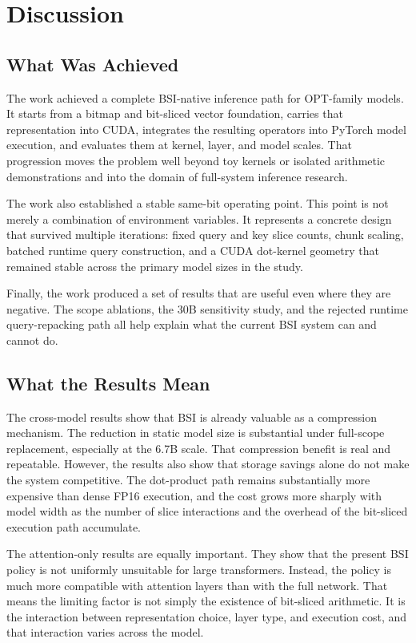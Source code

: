 \chapter{Discussion}

\section{What Was Achieved}
The work achieved a complete BSI-native inference path for OPT-family models. It starts from a bitmap and bit-sliced vector foundation, carries that representation into CUDA, integrates the resulting operators into PyTorch model execution, and evaluates them at kernel, layer, and model scales. That progression moves the problem well beyond toy kernels or isolated arithmetic demonstrations and into the domain of full-system inference research.

The work also established a stable same-bit operating point. This point is not merely a combination of environment variables. It represents a concrete design that survived multiple iterations: fixed query and key slice counts, chunk scaling, batched runtime query construction, and a CUDA dot-kernel geometry that remained stable across the primary model sizes in the study.

Finally, the work produced a set of results that are useful even where they are negative. The scope ablations, the 30B sensitivity study, and the rejected runtime query-repacking path all help explain what the current BSI system can and cannot do.

\section{What the Results Mean}
The cross-model results show that BSI is already valuable as a compression mechanism. The reduction in static model size is substantial under full-scope replacement, especially at the 6.7B scale. That compression benefit is real and repeatable. However, the results also show that storage savings alone do not make the system competitive. The dot-product path remains substantially more expensive than dense FP16 execution, and the cost grows more sharply with model width as the number of slice interactions and the overhead of the bit-sliced execution path accumulate.

The attention-only results are equally important. They show that the present BSI policy is not uniformly unsuitable for large transformers. Instead, the policy is much more compatible with attention layers than with the full network. That means the limiting factor is not simply the existence of bit-sliced arithmetic. It is the interaction between representation choice, layer type, and execution cost, and that interaction varies across the model.

